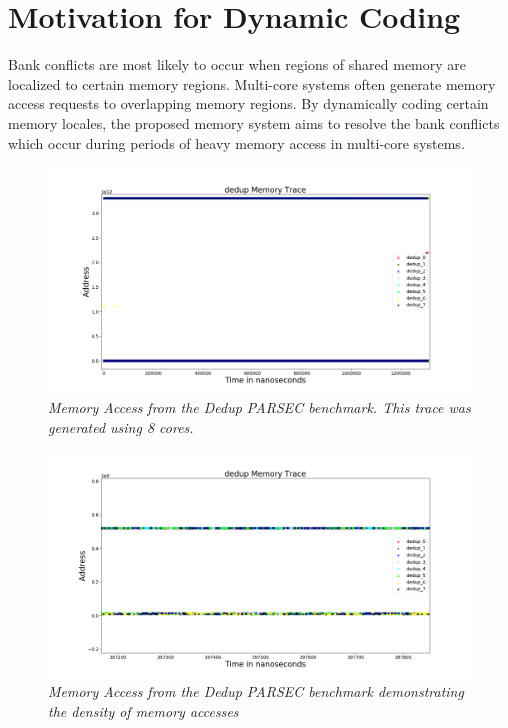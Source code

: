 \section{Motivation for Dynamic Coding}\label{sec:parsec_motivation}
Bank conflicts are most likely to occur when regions of shared memory are localized to certain memory regions. Multi-core systems often generate memory access requests to overlapping memory regions. By dynamically coding certain memory locales, the proposed memory system aims to resolve the bank conflicts which occur during periods of heavy memory access in multi-core systems.

\begin{figure}[htbp]
		\includegraphics[width=\linewidth]{fig/dedup_whole.png}
		\caption{\it{Memory Access from the Dedup PARSEC benchmark. This trace was generated using 8 cores.}}
		\label{fig:dedup_whole}
\end{figure}

\begin{figure}[htbp]
		\includegraphics[width=\linewidth]{fig/dedup_dense.png}
		\caption{\it{Memory Access from the Dedup PARSEC benchmark demonstrating the density of memory accesses}}
		\label{fig:dedup_dense}
\end{figure}

